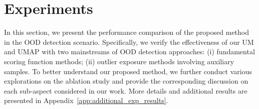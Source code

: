 \documentclass{article}
\theoremstyle{plain}
\theoremstyle{definition}
\theoremstyle{remark}
\begin{document}
\section{Experiments}
\label{sec:exp}

In this section, we present the performance comparison of the proposed method in the OOD detection scenario. Specifically, we verify the effectiveness of our UM and UMAP with two mainstreams of OOD detection approaches: (i) fundamental scoring function methods; (ii) outlier exposure methods involving auxiliary samples. To better understand our proposed method, we further conduct various explorations on the ablation study and provide the corresponding discussion on each sub-aspect considered in our work. More details and additional results are presented in Appendix~\ref{app:additional_exp_results}.
\end{document}
